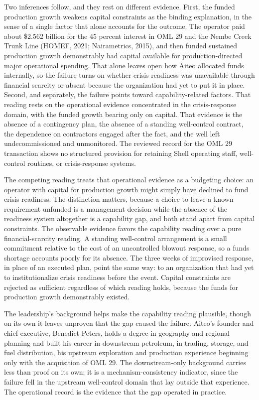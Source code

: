 \documentclass[twoside,fontset=lmodern]{mitthesis}
\begin{document}
Two inferences follow, and they rest on different evidence. First, the
funded production growth weakens capital constraints as the binding
explanation, in the sense of a single factor that alone accounts for the
outcome. The operator paid about \$2.562 billion for the 45 percent
interest in OML 29 and the Nembe Creek Trunk Line (HOMEF, 2021;
Nairametrics, 2015), and then funded sustained production growth
demonstrably had capital available for production-directed major
operational spending. That alone leaves open how Aiteo allocated funds
internally, so the failure turns on whether crisis readiness was
unavailable through financial scarcity or absent because the
organization had yet to put it in place. Second, and separately, the
failure points toward capability-related factors. That reading rests on
the operational evidence concentrated in the crisis-response domain,
with the funded growth bearing only on capital. That evidence is the
absence of a contingency plan, the absence of a standing well-control
contract, the dependence on contractors engaged after the fact, and the
well left undecommissioned and unmonitored. The reviewed record for the
OML 29 transaction shows no structured provision for retaining Shell
operating staff, well-control routines, or crisis-response systems.

The competing reading treats that operational evidence as a budgeting
choice: an operator with capital for production growth might simply have
declined to fund crisis readiness. The distinction matters, because a
choice to leave a known requirement unfunded is a management decision
while the absence of the readiness system altogether is a capability
gap, and both stand apart from capital constraints. The observable
evidence favors the capability reading over a pure financial-scarcity
reading. A standing well-control arrangement is a small commitment
relative to the cost of an uncontrolled blowout response, so a funds
shortage accounts poorly for its absence. The three weeks of improvised
response, in place of an executed plan, point the same way: to an
organization that had yet to institutionalize crisis readiness before
the event. Capital constraints are rejected as sufficient regardless of
which reading holds, because the funds for production growth
demonstrably existed.

The leadership's background helps make the capability reading plausible,
though on its own it leaves unproven that the gap caused the failure.
Aiteo's founder and chief executive, Benedict Peters, holds a degree in
geography and regional planning and built his career in downstream
petroleum, in trading, storage, and fuel distribution, his upstream
exploration and production experience beginning only with the
acquisition of OML 29. The downstream-only background carries less than
proof on its own; it is a mechanism-consistency indicator, since the
failure fell in the upstream well-control domain that lay outside that
experience. The operational record is the evidence that the gap operated
in practice.
\end{document}
